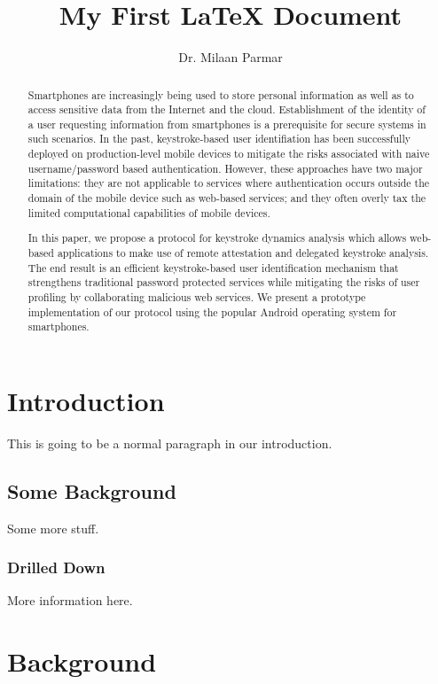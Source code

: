 \documentclass{article}
\begin{document}
\title{My First LaTeX Document}
\author{Dr. Milaan Parmar}

\maketitle
\begin{abstract}
Smartphones are increasingly being used to store personal information as well as to access sensitive data from the Internet and the cloud. Establishment of the identity of a user requesting information from smartphones is a prerequisite for  secure systems in such scenarios. In the past, keystroke-based user identifiation has been successfully deployed on production-level mobile devices to mitigate the risks associated with naive username/password based authentication. However, these approaches have two major limitations: they are not applicable to services where authentication occurs outside the domain of the mobile
device such as web-based services; and they often overly tax the limited computational capabilities of mobile devices.

In this paper, we propose a protocol for keystroke dynamics analysis which allows web-based applications to make use of remote attestation and delegated keystroke analysis. The end result is an efficient keystroke-based user identification mechanism that strengthens traditional password protected services
while mitigating the risks of user profiling by collaborating malicious web
services. We present a prototype implementation of our protocol using
the popular Android operating system for smartphones.
\end{abstract}

\section{Introduction} 
This is going to be a normal paragraph in our introduction. 

\subsection{Some Background} 
Some more stuff. 

\subsubsection{Drilled Down}\label{sec:drilled-down}
More information here. 

\section{Background}\label{sec:background}
\end{document}
